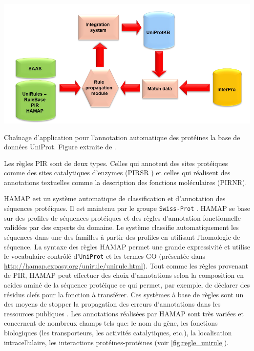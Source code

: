 \begin{refsegment}
    \begin{shadedfigure}[H]
        \centering
        \includegraphics[width=\textwidth]{img/unirule.png}
        \caption{ Chaînage d'application pour l'annotation automatique des protéines la base de données UniProt. Figure extraite de . }
        \label{fig:unirule}
    \end{shadedfigure}

    Les règles \gls{PIR} sont de deux types. Celles qui annotent des sites protéiques comme des sites catalytiques d'enzymes (\gls{PIRSR} \cite{vasudevan2011structure}) et celles qui réalisent des annotations textuelles comme la description des fonctions moléculaires (\gls{PIRNR}).
    
    \gls{HAMAP} est un système automatique de classification et d'annotation des séquences protéiques. Il est maintenu par le groupe \texttt{Swiss-Prot} . \gls{HAMAP} se base sur des profiles de séquences protéiques et des règles d'annotation fonctionnelle validées par des experts du domaine. Le système classifie automatiquement les séquences dans une des familles à partir des profiles en utilisant l'homologie de séquence. La syntaxe des règles  \gls{HAMAP} permet une grande expressivité et utilise le vocabulaire contrôlé d'\texttt{UniProt} et les termes \gls{GO} (présentée dans \url{http://hamap.expasy.org/unirule/unirule.html}). Tout comme les règles provenant de \gls{PIR}, \gls{HAMAP} peut effectuer des choix d'annotations selon la composition en acides aminé de la séquence protéique ce qui permet, par exemple, de déclarer des résidus clefs pour la fonction à transférer. Ces systèmes à base de règles sont un des moyens de stopper la propagation des erreurs d'annotations dans les ressources publiques \cite{schnoes2009annotation,devos2001intrinsic,bell2013can,gilks2002modeling}. Les annotations réalisées par \gls{HAMAP} sont très variées et concernent de nombreux champs tels que: le nom du gène, les fonctions biologiques (les transporteurs, les activités catalytiques, etc.), la localisation intracellulaire, les interactions protéines-protéines (voir \cref{fig:regle_unirule}).
    

\end{refsegment}
